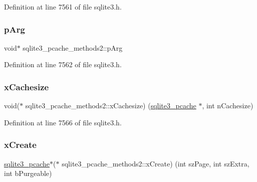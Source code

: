 Definition at line 7561 of file sqlite3.\+h.

\mbox{\label{structsqlite3__pcache__methods2_aee83131f16bb88218d7b0339854719d6}} 
\subsubsection{\texorpdfstring{p\+Arg}{pArg}}
{\footnotesize\ttfamily void$\ast$ sqlite3\+\_\+pcache\+\_\+methods2\+::p\+Arg}



Definition at line 7562 of file sqlite3.\+h.

\mbox{\label{structsqlite3__pcache__methods2_a76de689adc20fdbfef427b1c7ae1bcea}} 
\subsubsection{\texorpdfstring{x\+Cachesize}{xCachesize}}
{\footnotesize\ttfamily void($\ast$ sqlite3\+\_\+pcache\+\_\+methods2\+::x\+Cachesize) (\mbox{\hyperlink{sqlite3_8h_a096c453d937d51f7926d7d31c8e0bd2f}{sqlite3\+\_\+pcache}} $\ast$, int n\+Cachesize)}



Definition at line 7566 of file sqlite3.\+h.

\mbox{\label{structsqlite3__pcache__methods2_aa8babc280d7ba89c6c279301d5a36d69}} 
\subsubsection{\texorpdfstring{x\+Create}{xCreate}}
{\footnotesize\ttfamily \mbox{\hyperlink{sqlite3_8h_a096c453d937d51f7926d7d31c8e0bd2f}{sqlite3\+\_\+pcache}}$\ast$($\ast$ sqlite3\+\_\+pcache\+\_\+methods2\+::x\+Create) (int sz\+Page, int sz\+Extra, int b\+Purgeable)}



